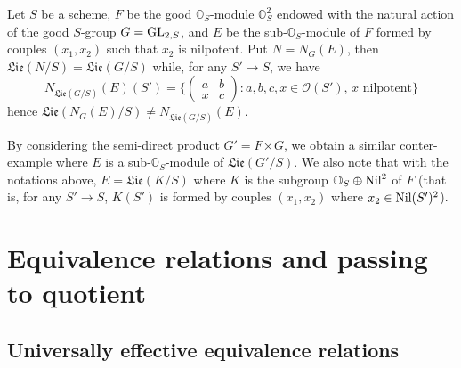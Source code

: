 \begin{example}\label{scheme group Lie and normalizer nonequal example}
Let $S$ be a scheme, $F$ be the good $\mathbb{O}_S$-module $\mathbb{O}_S^2$ endowed with the natural action of the good $S$-group $G=\mathrm{GL}_{2,S}$, and $E$ be the sub-$\mathbb{O}_S$-module of $F$ formed by couples $(x_1,x_2)$ such that $x_2$ is nilpotent. Put $N=N_G(E)$, then $\mathfrak{Lie}(N/S)=\mathfrak{Lie}(G/S)$ while, for any $S'\to S$, we have
\[N_{\mathfrak{Lie}(G/S)}(E)(S')=\Big\{\begin{pmatrix}
a&b\\
x&c
\end{pmatrix}:\text{$a,b,c,x\in\mathscr{O}(S')$, $x$ nilpotent}\Big\}\]
hence $\mathfrak{Lie}(N_G(E)/S)\neq N_{\mathfrak{Lie}(G/S)}(E)$.\par
By considering the semi-direct product $G'=F\rtimes G$, we obtain a similar conter-example where $E$ is a sub-$\mathbb{O}_S$-module of $\mathfrak{Lie}(G'/S)$. We also note that with the notations above, $E=\mathfrak{Lie}(K/S)$ where $K$ is the subgroup $\mathbb{O}_S\oplus\mathrm{Nil}^2$ of $F$ (that is, for any $S'\to S$, $K(S')$ is formed by couples $(x_1,x_2)$ where $x_2\in\mathrm{Nil}(S')^2$).
\end{example}

\section{Equivalence relations and passing to quotient}
\subsection{Universally effective equivalence relations}
